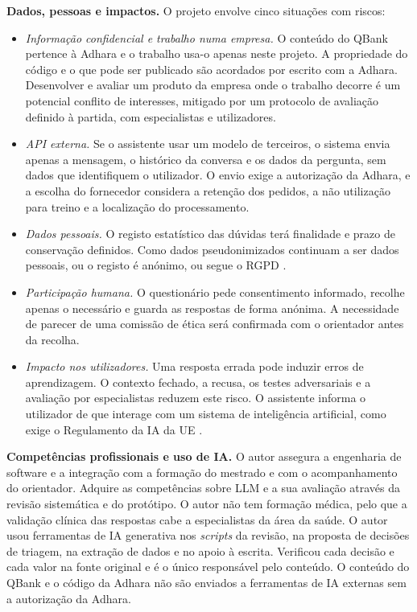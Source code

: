 \documentclass[11pt,a4paper]{article}
\begin{document}
\textbf{Dados, pessoas e impactos.} O projeto envolve cinco situações com riscos:
\begin{itemize}
    \item \emph{Informação confidencial e trabalho numa empresa.} O conteúdo do QBank pertence à Adhara e o trabalho usa-o apenas neste projeto. A propriedade do código e o que pode ser publicado são acordados por escrito com a Adhara. Desenvolver e avaliar um produto da empresa onde o trabalho decorre é um potencial conflito de interesses, mitigado por um protocolo de avaliação definido à partida, com especialistas e utilizadores.
    \item \emph{API externa.} Se o assistente usar um modelo de terceiros, o sistema envia apenas a mensagem, o histórico da conversa e os dados da pergunta, sem dados que identifiquem o utilizador. O envio exige a autorização da Adhara, e a escolha do fornecedor considera a retenção dos pedidos, a não utilização para treino e a localização do processamento.
    \item \emph{Dados pessoais.} O registo estatístico das dúvidas terá finalidade e prazo de conservação definidos. Como dados pseudonimizados continuam a ser dados pessoais, ou o registo é anónimo, ou segue o RGPD \parencite{eu2016gdpr}.
    \item \emph{Participação humana.} O questionário pede consentimento informado, recolhe apenas o necessário e guarda as respostas de forma anónima. A necessidade de parecer de uma comissão de ética será confirmada com o orientador antes da recolha.
    \item \emph{Impacto nos utilizadores.} Uma resposta errada pode induzir erros de aprendizagem. O contexto fechado, a recusa, os testes adversariais e a avaliação por especialistas reduzem este risco. O assistente informa o utilizador de que interage com um sistema de inteligência artificial, como exige o Regulamento da IA da UE \parencite{eu2024aiact}.
\end{itemize}

\textbf{Competências profissionais e uso de IA.} O autor assegura a engenharia de software e a integração com a formação do mestrado e com o acompanhamento do orientador. Adquire as competências sobre LLM e a sua avaliação através da revisão sistemática e do protótipo. O autor não tem formação médica, pelo que a validação clínica das respostas cabe a especialistas da área da saúde. O autor usou ferramentas de IA generativa nos \emph{scripts} da revisão, na proposta de decisões de triagem, na extração de dados e no apoio à escrita. Verificou cada decisão e cada valor na fonte original e é o único responsável pelo conteúdo. O conteúdo do QBank e o código da Adhara não são enviados a ferramentas de IA externas sem a autorização da Adhara.

{\small\printbibliography[title={Referências Bibliográficas}]}
\end{document}
